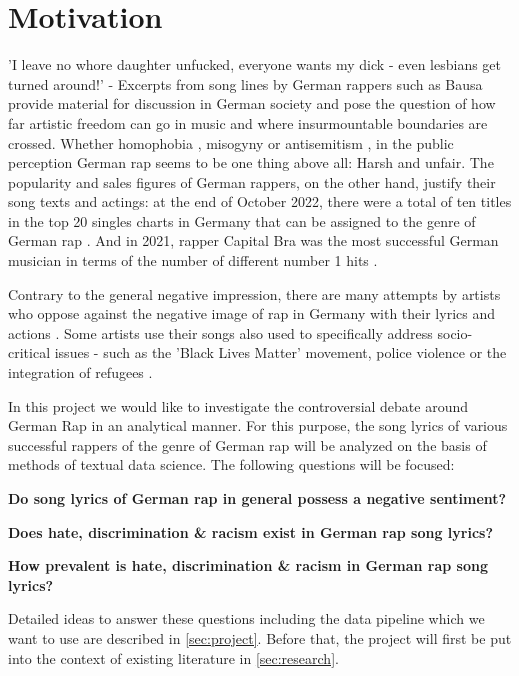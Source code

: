 \section{Motivation}
'I leave no whore daughter unfucked, everyone wants my dick - even lesbians get turned around!' - Excerpts from song lines by German rappers such as Bausa \cite{steffes-lay_2019} provide material for discussion in German society and pose the question of how far artistic freedom can go in music and where insurmountable boundaries are crossed. Whether homophobia \cite{steffes-lay_2019}, misogyny \cite{steffes-lay_2019} or antisemitism \cite{salomo_greven_2021}, in the public perception German rap seems to be one thing above all: Harsh and unfair. The popularity and sales figures of German rappers, on the other hand, justify their song texts and actings: at the end of October 2022, there were a total of ten titles in the top 20 singles charts in Germany that can be assigned to the genre of German rap \cite{mtv_germany_2022}. And in 2021, rapper Capital Bra was the most successful German musician in terms of the number of different number 1 hits \cite{br_2019}. 

Contrary to the general negative impression, there are many attempts by artists who oppose against the negative image of rap in Germany with their lyrics and actions \cite{Deutschlandfunk_2021}. Some artists use their songs also used to specifically address socio-critical issues - such as the 'Black Lives Matter' movement, police violence or the integration of refugees \cite{me-redaktion_2021}.

In this project we would like to investigate the controversial debate around German Rap in an analytical manner. For this purpose, the song lyrics of various successful rappers of the genre of German rap will be analyzed on the basis of methods of textual data science. The following questions will be focused:

\begin{questions}
    \item \textbf{Do song lyrics of German rap in general possess a negative sentiment?}
    \item \textbf{Does hate, discrimination \& racism exist in German rap song lyrics?}
    \item \textbf{How prevalent is hate, discrimination \& racism in German rap song lyrics?}
\end{questions}

Detailed ideas to answer these questions including the data pipeline which we want to use are described in \autoref{sec:project}. Before that, the project will first be put into the context of existing literature in \autoref{sec:research}.










